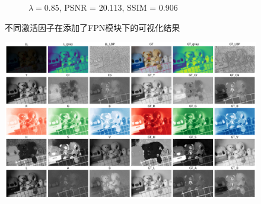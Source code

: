 \documentclass[a4paper]{ctexart}
\begin{document}
\begin{figure}[htbp]
\begin{subfigure}{0.45\textwidth}
				\caption{$\lambda = 0.85$, PSNR = 20.113, SSIM = 0.906}
				\label{fig: fpn_lambda = 0.85}	
			\end{subfigure}
			\caption{
				\label{fig: skip_fpn}
				不同激活因子在添加了FPN模块下的可视化结果
			}
		\end{figure}
		
		\begin{figure}[htbp]
			\centering
			\includegraphics[width=0.7\linewidth]{picture/LLIE/Experiment/myplot_different_color_channels_low00010}
			\caption{}
			\label{fig: myplot_different_color_channels_low00010}	
		\end{figure}
		
		\renewcommand{\refname}{References}
		
		
			
			
			
			
			
			
		
		
		
		
		
	
\end{document}
